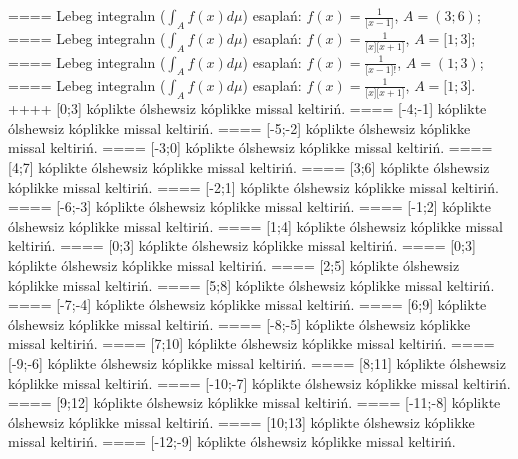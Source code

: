 ====
Lebeg integralın (\(\int_{A}^{}{f(x)d\mu}\)) esaplań: \(f(x) = \frac{1}{\lbrack x - 1\rbrack}\), \(A = (3;6)\);
====
Lebeg integralın (\(\int_{A}^{}{f(x)d\mu}\)) esaplań: \(f(x) = \frac{1}{\lbrack x\rbrack\lbrack x + 1\rbrack}\), \(A = \lbrack 1;3\rbrack\);
====
Lebeg integralın (\(\int_{A}^{}{f(x)d\mu}\)) esaplań: \(f(x) = \frac{1}{\lbrack x - 1\rbrack!}\), \(A = (1;3)\);
====
Lebeg integralın (\(\int_{A}^{}{f(x)d\mu}\)) esaplań: \(f(x) = \frac{1}{\lbrack x\rbrack\lbrack x + 1\rbrack}\), \(A = \lbrack 1;3\rbrack\).
++++
[0;3] kóplikte ólshewsiz kóplikke missal keltiriń.
====
[-4;-1] kóplikte ólshewsiz kóplikke missal keltiriń.
====
[-5;-2] kóplikte ólshewsiz kóplikke missal keltiriń.
====
[-3;0] kóplikte ólshewsiz kóplikke missal keltiriń.
====
[4;7] kóplikte ólshewsiz kóplikke missal keltiriń.
====
[3;6] kóplikte ólshewsiz kóplikke missal keltiriń.
====
[-2;1] kóplikte ólshewsiz kóplikke missal keltiriń.
====
[-6;-3] kóplikte ólshewsiz kóplikke missal keltiriń.
====
[-1;2] kóplikte ólshewsiz kóplikke missal keltiriń.
====
[1;4] kóplikte ólshewsiz kóplikke missal keltiriń.
====
[0;3] kóplikte ólshewsiz kóplikke missal keltiriń.
====
[0;3] kóplikte ólshewsiz kóplikke missal keltiriń.
====
[2;5] kóplikte ólshewsiz kóplikke missal keltiriń.
====
[5;8] kóplikte ólshewsiz kóplikke missal keltiriń.
====
[-7;-4] kóplikte ólshewsiz kóplikke missal keltiriń.
====
[6;9] kóplikte ólshewsiz kóplikke missal keltiriń.
====
[-8;-5] kóplikte ólshewsiz kóplikke missal keltiriń.
====
[7;10] kóplikte ólshewsiz kóplikke missal keltiriń.
====
[-9;-6] kóplikte ólshewsiz kóplikke missal keltiriń.
====
[8;11] kóplikte ólshewsiz kóplikke missal keltiriń.
====
[-10;-7] kóplikte ólshewsiz kóplikke missal keltiriń.
====
[9;12] kóplikte ólshewsiz kóplikke missal keltiriń.
====
[-11;-8] kóplikte ólshewsiz kóplikke missal keltiriń.
====
[10;13] kóplikte ólshewsiz kóplikke missal keltiriń.
====
[-12;-9] kóplikte ólshewsiz kóplikke missal keltiriń.

